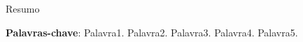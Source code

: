 \setlength{\absparsep}{18pt} %

\begin{resumo}
Resumo

\noindent\textbf{Palavras-chave}: Palavra1. Palavra2. Palavra3. Palavra4. Palavra5.
\end{resumo}

   



